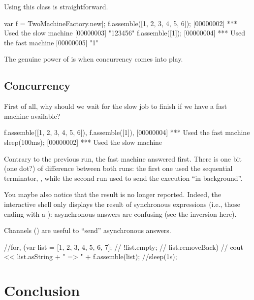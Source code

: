 Using this class is straightforward.

\begin{urbiscript}
var f = TwoMachineFactory.new|;
f.assemble([1, 2, 3, 4, 5, 6]);
[00000002] *** Used the slow machine
[00000003] "123456"
f.assemble([1]);
[00000004] *** Used the fast machine
[00000005] "1"
\end{urbiscript}

The genuine power of \us is when concurrency comes into play.

\subsection{Concurrency}
%
%
%

First of all, why should we wait for the slow job to finish if we have
a fast machine available?

\begin{urbiscript}
f.assemble([1, 2, 3, 4, 5, 6]),
f.assemble([1]),
[00000004] *** Used the fast machine
sleep(100ms);
[00000002] *** Used the slow machine
\end{urbiscript}

Contrary to the previous run, the fast machine answered first.  There
is one bit (one dot?) of difference between both runs: the first one
used the sequential terminator, \samp{;}, while the second run used
\samp{,} to send the execution ``in background''.

You maybe also notice that the result is no longer reported.  Indeed,
the \us interactive shell only displays the result of synchronous
expressions (i.e., those ending with a \samp{;}): asynchronous answers
are confusing (see the inversion here).

Channels () are useful to ``send'' asynchronous
answers.

\begin{urbiassert}
//for, (var list = [1, 2, 3, 4, 5, 6, 7];
//      !list.empty;
//      list.removeBack)
//  cout << list.asString + " => " + f.assemble(list);
//sleep(1s);
\end{urbiassert}

\section{Conclusion}



